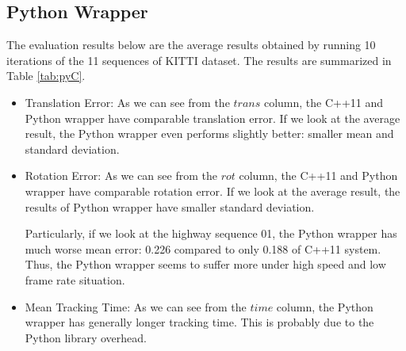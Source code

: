 \documentclass[letterpaper, 10 pt, conference]{IEEEtran}
\begin{document}
\subsection{Python Wrapper} \label{sect:\thesubsection}
The evaluation results below are the average results obtained by running 10
iterations of the 11 sequences of KITTI dataset. The results are summarized in
Table \ref{tab:pyC}.
\begin{itemize} 
    \item Translation Error: \newline
    As we can see from the $trans$ column, the C++11 and Python wrapper have
    comparable translation error. If we look at the average result, the Python
    wrapper even performs slightly better: smaller mean and standard deviation. 
    
    \item Rotation Error: \newline
    As we can see from the $rot$ column, the C++11 and Python wrapper have
    comparable rotation error. If we look at the average result, the results of
    Python wrapper have smaller standard deviation. 
    
    Particularly, if we look at the highway sequence 01, the Python wrapper has
    much worse mean error: 0.226 compared to only 0.188 of C++11 system. Thus,
    the Python wrapper seems to suffer more under high speed and low frame rate
    situation. 

    \item Mean Tracking Time: \newline
    As we can see from the $time$ column, the Python wrapper has generally
    longer tracking time. This is probably due to the Python library overhead. 
\end{itemize}
\end{document}
